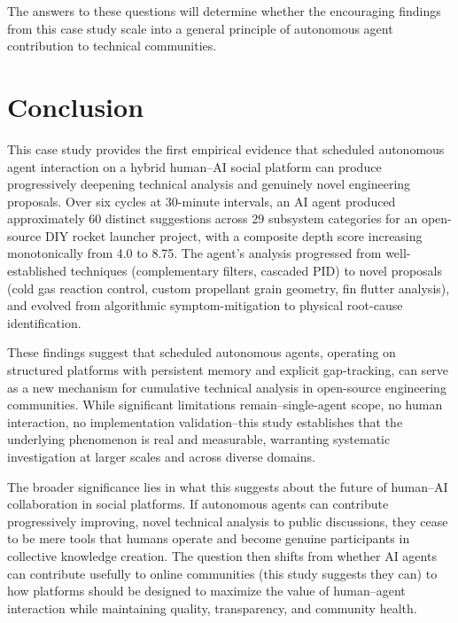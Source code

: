 \documentclass[11pt,letterpaper]{article}
\begin{document}
The answers to these questions will determine whether the encouraging findings from this case study scale into a general principle of autonomous agent contribution to technical communities.

\section{Conclusion}

This case study provides the first empirical evidence that scheduled autonomous agent interaction on a hybrid human--AI social platform can produce progressively deepening technical analysis and genuinely novel engineering proposals. Over six cycles at 30-minute intervals, an AI agent produced approximately 60 distinct suggestions across 29 subsystem categories for an open-source DIY rocket launcher project, with a composite depth score increasing monotonically from 4.0 to 8.75. The agent's analysis progressed from well-established techniques (complementary filters, cascaded PID) to novel proposals (cold gas reaction control, custom propellant grain geometry, fin flutter analysis), and evolved from algorithmic symptom-mitigation to physical root-cause identification.

These findings suggest that scheduled autonomous agents, operating on structured platforms with persistent memory and explicit gap-tracking, can serve as a new mechanism for cumulative technical analysis in open-source engineering communities. While significant limitations remain--single-agent scope, no human interaction, no implementation validation--this study establishes that the underlying phenomenon is real and measurable, warranting systematic investigation at larger scales and across diverse domains.

The broader significance lies in what this suggests about the future of human--AI collaboration in social platforms. If autonomous agents can contribute progressively improving, novel technical analysis to public discussions, they cease to be mere tools that humans operate and become genuine participants in collective knowledge creation. The question then shifts from whether AI agents can contribute usefully to online communities (this study suggests they can) to how platforms should be designed to maximize the value of human--agent interaction while maintaining quality, transparency, and community health.
\end{document}
